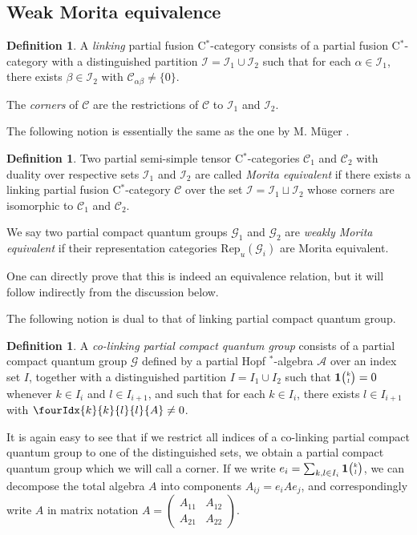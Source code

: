 \documentclass[10pt]{article}
\newcommand{\CatC}{\mathcal{C}}
\newcommand{\CatCC}{\mathscr{C}}
\newcommand{\Rep}{\mathrm{Rep}}
\newcommand{\Grt}[3]{#1{\tiny {\begin{pmatrix} #2\\#3\end{pmatrix}}}}
\newcommand{\UnitC}[2]{\Grt{\mathbf{1}}{#1}{#2}}
\newcommand{\Gr}[5]{\fourIdx{#2}{#4}{#3}{#5}{#1}}%
\theoremstyle{definition}
\newtheorem{Def}[Theorem]{Definition}
\numberwithin{equation}{section}
\begin{document}
\subsection{Weak Morita equivalence}

\begin{Def} A \emph{linking} partial fusion C$^*$-category consists of a partial fusion C$^*$-category with a distinguished partition $\mathscr{I} =\mathscr{I}_1 \cup \mathscr{I}_2$ such that for each $\alpha\in \mathscr{I}_1$, there exists $\beta \in \mathscr{I}_{2}$ with $\CatC_{\alpha\beta}\neq \{0\}$.

The \emph{corners} of $\CatCC$ are the restrictions of $\CatCC$ to $\mathscr{I}_1$ and $\mathscr{I}_2$.
\end{Def}

The following notion is essentially the same as the one by M. M\"{u}ger \cite{Mug1}. 

\begin{Def} Two partial semi-simple tensor C$^*$-categories $\CatCC_1$ and $\CatCC_2$ with duality over respective sets $\mathscr{I}_1$ and $\mathscr{I}_2$ are called \emph{Morita equivalent} if there exists a linking partial fusion C$^*$-category $\CatCC$ over the set $\mathscr{I}=\mathscr{I}_1\sqcup \mathscr{I}_2$ whose corners are isomorphic to $\CatCC_1$ and $\CatCC_2$.

We say two partial compact quantum groups $\mathscr{G}_1$ and $\mathscr{G}_2$ are \emph{weakly Morita equivalent} if their representation categories $\Rep_u(\mathscr{G}_i)$ are Morita equivalent. 
\end{Def} 

One can directly prove that this is indeed an equivalence relation, but it will follow indirectly from the discussion below.

The following notion is dual to that of linking partial compact quantum group.

\begin{Def}\label{DefCoLink} A \emph{co-linking partial compact quantum group} consists of a partial compact quantum group $\mathscr{G}$ defined by a partial Hopf $^*$-algebra $\mathscr{A}$ over an index set $I$, together with a distinguished partition $I = I_1\cup I_2$ such that  $\UnitC{k}{l}=0$ whenever $k\in I_i$ and $l\in I_{i+1}$, and such that for each $k\in I_i$, there exists $l\in I_{i+1}$ with $\Gr{A}{k}{l}{k}{l}\neq 0$.  
\end{Def} 

It is again easy to see that if we restrict all indices of a co-linking partial compact quantum group to one of the distinguished sets, we obtain a partial compact quantum group which we will call a corner. If we write $e_i = \sum_{k,l\in I_i} \UnitC{k}{l}$, we can decompose the total algebra $A$ into components $A_{ij} = e_{i}Ae_{j}$, and correspondingly write $A$ in matrix notation $A = \begin{pmatrix} A_{11} & A_{12}  \\ A_{21} & A_{22}\end{pmatrix}$.
\end{document}
